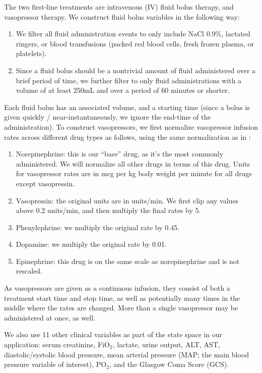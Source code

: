 \documentclass{article}
\begin{document}
The two first-line treatments are intravenous (IV) fluid bolus therapy, and vasopressor therapy. We construct fluid bolus variables in the following way:
\begin{enumerate}
    \item We filter all fluid administration events to only include NaCl 0.9\%, lactated ringers, or blood transfusions (packed red blood cells, fresh frozen plasma, or platelets).
    \item Since a fluid bolus should be a nontrivial amount of fluid administered over a brief period of time, we further filter to only fluid administrations with a volume of at least 250mL and over a period of 60 minutes or shorter.
\end{enumerate}
Each fluid bolus has an associated volume, and a starting time (since a bolus is given quickly / near-instantaneously, we ignore the end-time of the administration). To construct vasopressors, we first normalize vasopressor infusion rates across different drug types as follows, using the same normalization as in \citet{komorowski2018artificial}:
\begin{enumerate}
    \item Norepinephrine: this is our ``base'' drug, as it's the most commonly administered. We will normalize all other drugs in terms of this drug. Units for vasopressor rates are in mcg per kg body weight per minute for all drugs except vasopressin.
    \item Vasopressin: the original units are in units/min. We first clip any values above 0.2 units/min, and then multiply the final rates by 5.
    \item Phenylephrine: we multiply the original rate by 0.45.
    \item Dopamine: we multiply the original rate by 0.01.
    \item Epinephrine: this drug is on the same scale as norepinephrine and is not rescaled.
\end{enumerate}
As vasopressors are given as a continuous infusion, they consist of both a treatment start time and stop time, as well as potentially many times in the middle where the rates are changed. More than a single vasopressor may be administered at once, as well.

We also use 11 other clinical variables as part of the state space in our application: serum creatinine, FiO$_2$, lactate, urine output, ALT, AST, diastolic/systolic blood pressure, mean arterial pressure (MAP; the main blood pressure variable of interest), PO$_2$, and the Glasgow Coma Score (GCS). 
\end{document}
